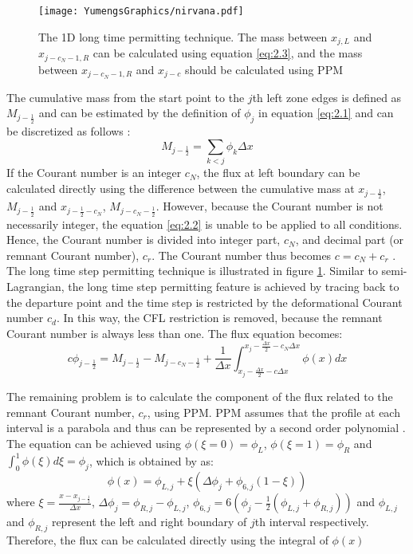\begin{figure}
\centering
\texttt{[image: YumengsGraphics/nirvana.pdf]}
\caption{The 1D long time permitting technique. The mass between $x_{j,L}$ and $x_{j-c_N-1,R}$ can be calculated using equation \ref{eq:2.3}, and the mass between $x_{j-c_N-1,R}$ and $x_{j-c}$ should be calculated using PPM \label{fig:2.1}}
\end{figure}
The cumulative mass from the start point to the $j$th left zone edges is defined as $M_{j-\frac{1}{2}}$ and can be estimated by the definition of $\phi_j$ in equation \ref{eq:2.1} and can be discretized as follows \citep{Colella1984}:
\begin{equation} \label{eq:2.3}
M_{j-\frac{1}{2}} = \sum_{k < j} \phi_{k}\Delta x
\end{equation} 
If the Courant number is an integer $c_N$, the flux at left boundary can be calculated directly using the difference between the cumulative mass at $x_{j-\frac{1}{2}}$, $M_{j-\frac{1}{2}}$ and $x_{j-\frac{1}{2}-c_N}$, $M_{j-c_N-\frac{1}{2}}$. However, because the Courant number is not necessarily integer, the equation \ref{eq:2.2} is unable to be applied to all conditions. Hence, the Courant number is divided into integer part, $c_N$, and decimal part (or remnant Courant number), $c_r$. The Courant number thus becomes $c = c_N + c_r$ \citep{Leonard1995}. The long time step permitting technique is illustrated in figure \ref{fig:2.1}. Similar to semi-Lagrangian, the long time step permitting feature is achieved by tracing back to the departure point and the time step is restricted by the deformational Courant number $c_d$. In this way, the CFL restriction is removed, because the remnant Courant number is always less than one. The flux equation becomes:
\begin{equation} 
c\phi_{j-\frac{1}{2}} = M_{j-\frac{1}{2}} - M_{j-c_N-\frac{1}{2}} + \frac{1}{\Delta x} \int^{x_j-\frac {\Delta x}{2}-c_N\Delta x}_{x_j-\frac {\Delta x}{2}-c\Delta x} \phi (x)dx 
\end{equation} 

The remaining problem is to calculate the component of the flux related to the remnant Courant number, $c_r$, using PPM. PPM assumes that the profile at each interval is a parabola and thus can be represented by a second order polynomial \citep{Colella1984}. The equation can be achieved using $\phi(\xi = 0) = \phi_L$, $\phi(\xi = 1) = \phi_R$ and $ \int^{1}_{0} \phi (\xi) d\xi = \phi_j  $, which is obtained by \citet{Colella1984} as:
\begin{equation} \label{eq:2.4} 
\phi(x) = \phi_{L,j} + \xi (\Delta \phi_j + \phi_{6,j}(1-\xi)) 
\end{equation} 
where $ \xi = \frac{x-x_{j-\frac{1}{2}}}{\Delta x} $, $ \Delta \phi_j = \phi_{R,j} - \phi_{L,j} $, $ \phi_{6,j} = 6(\phi_j-\frac{1}{2}(\phi_{L,j}+\phi_{R,j})) $ and $\phi_{L,j}$ and $\phi_{R,j}$ represent the left and right boundary of $j$th interval respectively. Therefore, the flux can be calculated directly using the integral of $\phi(x)$

